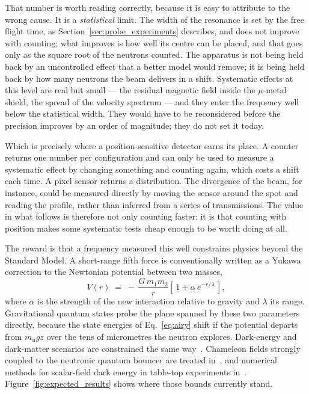 \documentclass[a4paper,headsepline,oneside,11pt]{scrartcl}
\begin{document}
That number is worth reading correctly, because it is easy to attribute to the
wrong cause. It is a \emph{statistical} limit. The width of the resonance is set by the
free flight time, as Section~\ref{sec:probe_experiments} describes, and does not
improve with counting; what improves is how well its centre can be placed, and
that goes only as the square root of the neutrons counted. The apparatus
is not being held back by an uncontrolled effect that a better model would
remove; it is being held back by how many neutrons the beam delivers in a
shift. Systematic effects at this level are real but small --- the residual
magnetic field inside the $\mu$-metal shield, the spread of the velocity
spectrum --- and they enter the frequency well below the statistical width. They
would have to be reconsidered before the precision improves by an order of
magnitude; they do not set it today.

Which is precisely where a position-sensitive detector earns its place. A
counter returns one number per configuration and can only be used to measure a
systematic effect by changing something and counting again, which costs a shift
each time. A pixel sensor returns a distribution. The divergence of the beam,
for instance, could be measured directly by moving the sensor around the spot
and reading the profile, rather than inferred from a series of transmissions.
The value in what follows is therefore not only counting faster: it is that
counting with position makes some systematic tests cheap enough to be worth
doing at all.

The reward is that a frequency measured this well constrains physics beyond the
Standard Model. A short-range fifth force is conventionally written as a Yukawa
correction to the Newtonian potential between two masses,
%
\begin{equation}
  V(r) \;=\; -\,\frac{G\,m_1 m_2}{r}
             \left[\, 1 + \alpha\, e^{-r/\lambda} \,\right],
  \label{eq:yukawa}
\end{equation}
%
where $\alpha$ is the strength of the new interaction relative to gravity and
$\lambda$ its range. Gravitational quantum states probe the plane spanned by
these two parameters directly, because the state energies of
Eq.~\eqref{eq:airy} shift if the potential departs from $m_\mathrm{n} g z$ over the tens
of micrometres the neutron explores. Dark-energy and dark-matter scenarios are
constrained the same way~\cite{Jenke2014}.
Chameleon fields strongly coupled to the neutronic quantum bouncer are treated
in~\cite{Brax2011}, and numerical methods for scalar-field dark energy in
table-top experiments in~\cite{Fischer2024}.
Figure~\ref{fig:expected_results} shows where those bounds currently stand.
\end{document}
